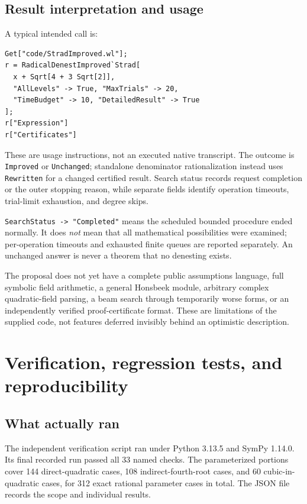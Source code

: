 \documentclass[11pt,letterpaper]{article}
\newcommand{\code}[1]{\texttt{#1}}
\theoremstyle{definition}
\begin{document}
\subsection{Result interpretation and usage}

A typical intended call is:
\begin{lstlisting}
Get["code/StradImproved.wl"];
r = RadicalDenestImproved`Strad[
  x + Sqrt[4 + 3 Sqrt[2]],
  "AllLevels" -> True, "MaxTrials" -> 20,
  "TimeBudget" -> 10, "DetailedResult" -> True
];
r["Expression"]
r["Certificates"]
\end{lstlisting}
These are usage instructions, not an executed native transcript. The outcome is \code{Improved} or \code{Unchanged}; standalone denominator rationalization instead uses \code{Rewritten} for a changed certified result. Search status records request completion or the outer stopping reason, while separate fields identify operation timeouts, trial-limit exhaustion, and degree skips.

\code{SearchStatus -> "Completed"} means the scheduled bounded procedure ended normally. It does \emph{not} mean that all mathematical possibilities were examined; per-operation timeouts and exhausted finite queues are reported separately. An unchanged answer is never a theorem that no denesting exists.

The proposal does not yet have a complete public assumptions language, full symbolic field arithmetic, a general Honsbeek module, arbitrary complex quadratic-field parsing, a beam search through temporarily worse forms, or an independently verified proof-certificate format. These are limitations of the supplied code, not features deferred invisibly behind an optimistic description.

\section{Verification, regression tests, and reproducibility}\label{sec:verification}

\subsection{What actually ran}

The independent verification script ran under Python 3.13.5 and SymPy 1.14.0. Its final recorded run passed all 33 named checks. The parameterized portions cover 144 direct-quadratic cases, 108 indirect-fourth-root cases, and 60 cubic-in-quadratic cases, for 312 exact rational parameter cases in total. The JSON file records the scope and individual results.
\end{document}
